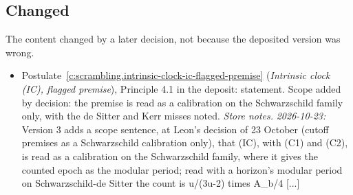 \documentclass[11pt]{article}
\theoremstyle{definition}
\theoremstyle{plain}
\begin{document}
\subsection*{Changed}
The content changed by a later decision, not because the deposited version was wrong.
\begin{itemize}\setlength{\itemsep}{2pt}
\item Postulate~\ref{c:scrambling.intrinsic-clock-ic-flagged-premise} (\emph{Intrinsic clock (IC), flagged premise}), Principle 4.1 in the deposit: statement. Scope added by decision: the premise is read as a calibration on the Schwarzschild family only, with the de Sitter and Kerr misses noted. \emph{Store notes.} \emph{2026-10-23:} Version 3 adds a scope sentence, at Leon's decision of 23 October (cutoff premises as a Schwarzschild calibration only), that (IC), with (C1) and (C2), is read as a calibration on the Schwarzschild family, where it gives the counted epoch as the modular period; read with a horizon's modular period on Schwarzschild-de Sitter the count is u/(3u-2) times A\_b/4 [...]
\end{itemize}
\end{document}
